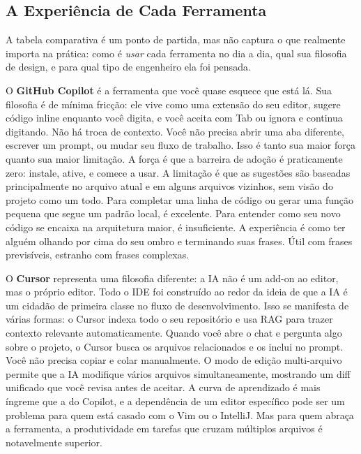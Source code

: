 \subsection{A Experiência de Cada Ferramenta}

A tabela comparativa é um ponto de partida, mas não captura o que realmente importa
na prática: como é \textit{usar} cada ferramenta no dia a dia, qual sua filosofia de
design, e para qual tipo de engenheiro ela foi pensada.

O \textbf{GitHub Copilot} é a ferramenta que você quase esquece que está lá. Sua
filosofia é de mínima fricção: ele vive como uma extensão do seu editor, sugere
código inline enquanto você digita, e você aceita com Tab ou ignora e continua
digitando. Não há troca de contexto. Você não precisa abrir uma aba diferente,
escrever um prompt, ou mudar seu fluxo de trabalho. Isso é tanto sua maior força
quanto sua maior limitação. A força é que a barreira de adoção é praticamente zero:
instale, ative, e comece a usar. A limitação é que as sugestões são baseadas
principalmente no arquivo atual e em alguns arquivos vizinhos, sem visão do projeto
como um todo. Para completar uma linha de código ou gerar uma função pequena que segue
um padrão local, é excelente. Para entender como seu novo código se encaixa na
arquitetura maior, é insuficiente. A experiência é como ter alguém olhando por cima
do seu ombro e terminando suas frases. Útil com frases previsíveis, estranho com
frases complexas.

O \textbf{Cursor} representa uma filosofia diferente: a IA não é um
add-on ao editor, mas o próprio editor. Todo o IDE foi construído ao redor da ideia de que
a IA é um cidadão de primeira classe no fluxo de desenvolvimento. Isso se manifesta de
várias formas: o Cursor indexa todo o seu repositório e usa RAG para trazer contexto
relevante automaticamente. Quando você abre o chat e pergunta algo sobre o projeto, o
Cursor busca os arquivos relacionados e os inclui no prompt. Você não precisa
copiar e colar manualmente. O modo de edição multi-arquivo permite que a IA modifique
vários arquivos simultaneamente, mostrando um diff unificado que você revisa antes de
aceitar. A curva de aprendizado é mais íngreme que a do Copilot, e a dependência de
um editor específico pode ser um problema para quem está casado com o Vim ou o
IntelliJ. Mas para quem abraça a ferramenta, a produtividade em tarefas que cruzam
múltiplos arquivos é notavelmente superior.

